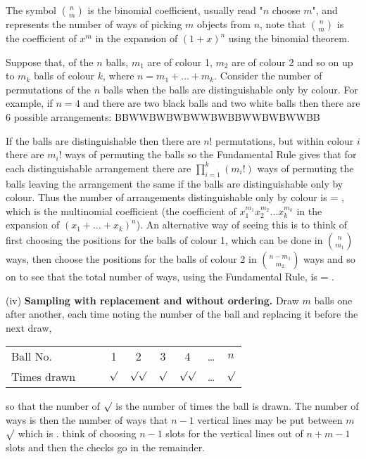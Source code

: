 \begin{example}
The symbol $\binom{n}{m}$ is the binomial coefficient, usually read "$n$ choose $m$", and represents the number of ways of picking $m$ objects from $n$, note that $\binom{n}{m}$ is the coefficient of $x^m$ in the expansion of $(1 + x)^n$ using the binomial theorem.

Suppose that, of the $n$ balls, $m_1$ are of colour 1, $m_2$ are of colour 2 and so on up to $m_k$ balls of colour $k$, where $n = m_1 + \dots + m_k$. Consider the number of permutations of the $n$
balls when the balls are distinguishable only by colour. For example, if $n = 4$ and there are two black balls and two white balls then there are 6 possible arrangements: 
\be 
BBWW\quad BWBW\quad BWWB\quad WBBW\quad WBWB\quad WWBB 
\ee

If the balls are distinguishable then there are $n!$ permutations, but within colour $i$ there are $m_i!$ ways of permuting the balls so the Fundamental Rule gives that for each distinguishable arrangement there are $\prod^k_{i=1} (m_i!)$ ways of permuting the balls leaving the arrangement the same if the balls are distinguishable only by colour. Thus the number of arrangements distinguishable only by colour is \be {} = , \ee which is the multinomial coefficient (the coefficient of $x^{m_1}_1 x^{m_2}_2 \dots x^{m_k}_k$ in the expansion of $(x_1 + \dots + x_k)^n$). An alternative way of seeing this is to think of first choosing the positions for the balls of colour 1, which can be done in $\binom{n}{m_1}$ ways, then choose the positions for the balls of colour 2 in $\binom{n- m_1}{m_2}$ ways and so on to see that the total number of ways, using the Fundamental Rule, is 
\be 
{} \cdots {} = . 
\ee

\item [(iv)] {\bf Sampling with replacement and without ordering.} Draw $m$ balls one after another, each time noting the number of the ball and replacing it before the next draw,
\begin{center}
\begin{tabular}{lcc c|c|c|c|c|c}
Ball No. & & & 1 & 2 & 3 & 4 & \dots & $n$\\
Times drawn & & & $\surd$ & $\surd\surd$ & $\surd$ & $\surd\surd$ & \dots & $\surd$\\
\end{tabular}
\end{center}

so that the number of $\surd$ is the number of times the ball is drawn. The number of ways is then the number of ways that $n - 1$ vertical lines may be put between $m$ $\surd$ which is
\be
{}.
\ee
think of choosing $n-1$ slots for the vertical lines out of $n+m-1$ slots and then the checks go in the remainder.
\een
\end{example}

